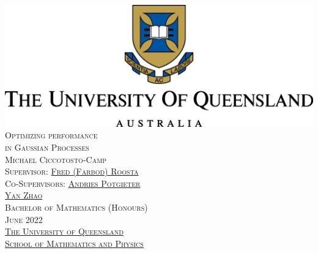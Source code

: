 \documentclass[11pt]{amsart}
\theoremstyle{remark}
\begin{document}
\thispagestyle{empty}
\begin{center}
    \includegraphics{university.png} \\
    \vspace{3cm}
    {\LARGE\textsc{Optimizing performance \\ in Gaussian Processes}} \\
    \vspace{0.3cm}
    {\textsc{Michael Ciccotosto-Camp}} \\
    \vspace{1cm}
    {\textsc{Supervisor: \href{https://people.smp.uq.edu.au/FredRoosta/}{Fred (Farbod) Roosta}}} \\
    {\textsc{Co-Supervisors: \href{https://researchers.uq.edu.au/researcher/2466}{Andries Potgieter} \\ \href{https://researchers.uq.edu.au/researcher/14230}{Yan Zhao}}} \\
    \vspace{5cm}
    {\textsc{Bachelor of Mathematics (Honours)}} \\
    {\textsc{June 2022}} \\
    \vspace{1cm}
    {\textsc{\href{https://www.uq.edu.au/}{The University of Queensland}}} \\
    {\textsc{\href{https://smp.uq.edu.au/}{School of Mathematics and Physics}}}
\end{center}
\newpage



\thispagestyle{empty}
\
\newpage
\end{document}
